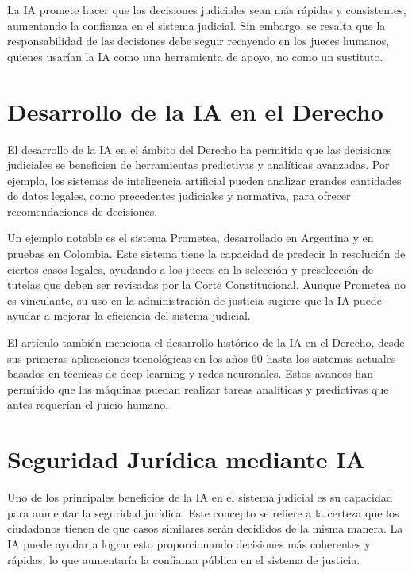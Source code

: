 \documentclass[runningheads]{llncs}
\begin{document}
La IA promete hacer que las decisiones judiciales sean más rápidas y consistentes, aumentando la confianza en el sistema judicial. Sin embargo, se resalta que la responsabilidad de las decisiones debe seguir recayendo en los jueces humanos, quienes usarían la IA como una herramienta de apoyo, no como un sustituto.
\section{Desarrollo de la IA en el Derecho}
El desarrollo de la IA en el ámbito del Derecho ha permitido que las decisiones judiciales se beneficien de herramientas predictivas y analíticas avanzadas. Por ejemplo, los sistemas de inteligencia artificial pueden analizar grandes cantidades de datos legales, como precedentes judiciales y normativa, para ofrecer recomendaciones de decisiones.

Un ejemplo notable es el sistema Prometea, desarrollado en Argentina y en pruebas en Colombia. Este sistema tiene la capacidad de predecir la resolución de ciertos casos legales, ayudando a los jueces en la selección y preselección de tutelas que deben ser revisadas por la Corte Constitucional. Aunque Prometea no es vinculante, su uso en la administración de justicia sugiere que la IA puede ayudar a mejorar la eficiencia del sistema judicial.

El artículo también menciona el desarrollo histórico de la IA en el Derecho, desde sus primeras aplicaciones tecnológicas en los años 60 hasta los sistemas actuales basados en técnicas de deep learning y redes neuronales. Estos avances han permitido que las máquinas puedan realizar tareas analíticas y predictivas que antes requerían el juicio humano.

\section{Seguridad Jurídica mediante IA}
Uno de los principales beneficios de la IA en el sistema judicial es su capacidad para aumentar la seguridad jurídica. Este concepto se refiere a la certeza que los ciudadanos tienen de que casos similares serán decididos de la misma manera. La IA puede ayudar a lograr esto proporcionando decisiones más coherentes y rápidas, lo que aumentaría la confianza pública en el sistema de justicia.
\end{document}
